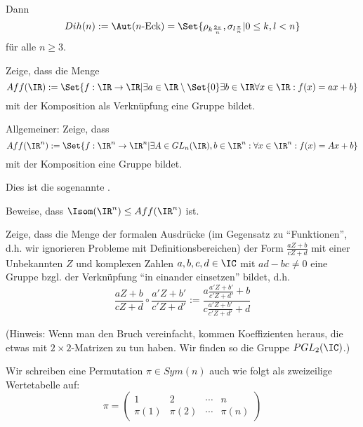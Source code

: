 \begin{sheet}
\begin{problem}[title={Diedergruppen / Symmetrien des regulären $n$-Ecks}]
Dann 
\[Dih(n):=\Aut(n\text{-Eck}) = \Set{\rho_{k\frac{2\pi}{n}}, \sigma_{l\frac{\pi}{n}} | 0\leq k,l<n}\]
für alle $n\geq 3$.
\end{problem}

\begin{problem}[title={Automorphismen des affinen Raums}]
\begin{subproblem}
Zeige, dass die Menge
\[Aff(\IR):=\Set{f:\IR\to\IR | \exists a\in\IR\setminus\Set{0} \exists b\in\IR \forall x\in\IR: f(x)=ax+b}\]
mit der Komposition als Verknüpfung eine Gruppe bildet.
\end{subproblem}
\begin{subproblem}
Allgemeiner: Zeige, dass
\[Aff(\IR^n):=\Set{f:\IR^n\to\IR^n | \exists A\in GL_n(\IR), b\in\IR^n: \forall x\in\IR^n: f(x)=Ax+b}\]
mit der Komposition eine Gruppe bildet.
\end{subproblem}
Dies ist die sogenannte .

\begin{subproblem}
Beweise, dass $\Isom(\IR^n)\leq Aff(\IR^n)$ ist.
\end{subproblem}
\end{problem}

\begin{problem}[title={Möbius-Transformationen / Automorphismen der projektiven Geraden}]
Zeige, dass die Menge der formalen Ausdrücke (im Gegensatz zu \enquote{Funktionen}, d.h. wir ignorieren Probleme mit Definitionsbereichen) der Form $\frac{aZ+b}{cZ+d}$ mit einer Unbekannten $Z$ und komplexen Zahlen $a,b,c,d\in\IC$ mit $ad-bc\neq 0$ eine Gruppe bzgl. der Verknüpfung \enquote{in einander einsetzen} bildet, d.h.
\[\frac{aZ+b}{cZ+d} \circ \frac{a'Z+b'}{c'Z+d'} := \frac{a\frac{a'Z+b'}{c'Z+d'}+b}{c\frac{a'Z+b'}{c'Z+d'}+d}\]

(Hinweis: Wenn man den Bruch vereinfacht, kommen Koeffizienten heraus, die etwas mit $2\times 2$-Matrizen zu tun haben. Wir finden so die Gruppe $PGL_2(\IC)$.)
\end{problem}



\begin{problem}
Wir schreiben eine Permutation $\pi\in Sym(n)$ auch wie folgt als zweizeilige Wertetabelle auf:
\[\pi = \begin{pmatrix} 1& 2 & \cdots & n \\ \pi(1) & \pi(2) & \cdots & \pi(n)\end{pmatrix}\]


\end{problem}
\end{sheet}
